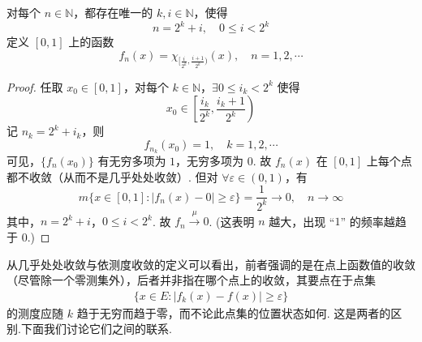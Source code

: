 \documentclass[../../main.tex]{subfiles}%
\begin{document}
\begin{example}[依测度收敛但不几乎处处收敛的函数]

对每个 $n\in\mathbb{N}$，都存在唯一的 $k,i\in\mathbb{N}$，使得
\[
n = 2^k + i,\quad 0\leqslant i<2^k
\]
定义 $[0,1]$ 上的函数
\[
f_n(x)=\chi_{[\frac{i}{2^k},\frac{i + 1}{2^k})}(x),\quad n = 1,2,\cdots
\]
\end{example}
\begin{proof}
任取 $x_0\in[0,1]$，对每个 $k\in\mathbb{N}$，$\exists 0\leqslant i_k<2^k$ 使得
\[
x_0\in\left[\frac{i_k}{2^k},\frac{i_k + 1}{2^k}\right)
\]
记 $n_k = 2^k + i_k$，则
\[
f_{n_k}(x_0)=1,\quad k = 1,2,\cdots
\]
可见，$\{f_n(x_0)\}$ 有无穷多项为 $1$，无穷多项为 $0$. 故 $f_n(x)$ 在 $[0,1]$ 上每个点都不收敛（从而不是几乎处处收敛）. 但对 $\forall\varepsilon\in(0,1)$，有
\[
m\{x\in[0,1]:\vert f_n(x)-0\vert\geqslant\varepsilon\}=\frac{1}{2^k}\to 0,\quad n\to\infty
\]
其中，$n = 2^k + i$，$0\leqslant i<2^k$. 故 $f_n\stackrel{\mu}{\longrightarrow}0$. (这表明 $n$ 越大，出现 “$1$” 的频率越趋于 $0$.) 
\end{proof}

\vspace{0.4cm}

从几乎处处收敛与依测度收敛的定义可以看出，前者强调的是在点上函数值的收敛（尽管除一个零测集外），后者并非指在哪个点上的收敛，其要点在于点集
\begin{align*}
\{x\in E:\vert f_k(x)-f(x)\vert\geqslant\varepsilon\}
\end{align*}
的测度应随 $k$ 趋于无穷而趋于零，而不论此点集的位置状态如何. 这是两者的区别.下面我们讨论它们之间的联系.
\end{document}
